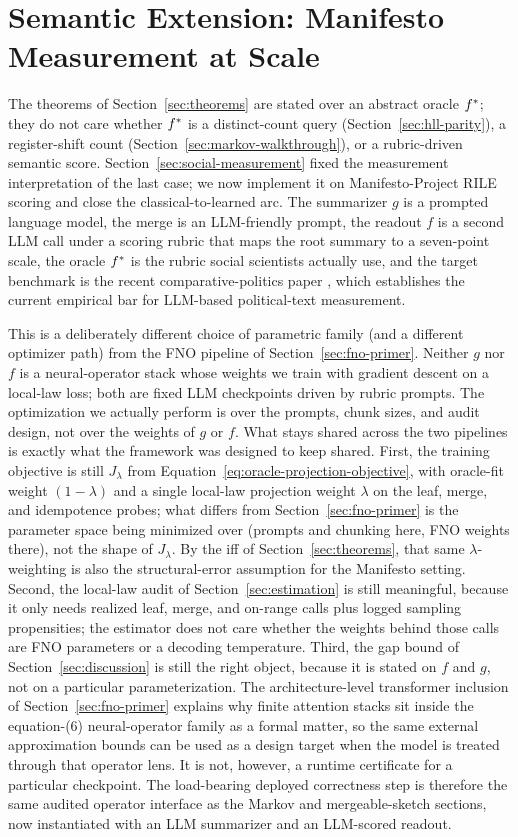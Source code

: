 \section{Semantic Extension: Manifesto Measurement at Scale}\label{sec:manifesto-llm}

The theorems of Section~\ref{sec:theorems} are stated over an abstract oracle $f^\ast$; they do not care whether $f^\ast$ is a distinct-count query (Section~\ref{sec:hll-parity}), a register-shift count (Section~\ref{sec:markov-walkthrough}), or a rubric-driven semantic score. Section~\ref{sec:social-measurement} fixed the measurement interpretation of the last case; we now implement it on Manifesto-Project RILE scoring and close the classical-to-learned arc. The summarizer $g$ is a prompted language model, the merge is an LLM-friendly prompt, the readout $f$ is a second LLM call under a scoring rubric that maps the root summary to a seven-point scale, the oracle $f^\ast$ is the rubric social scientists actually use, and the target benchmark is the recent comparative-politics paper \citet{BenoitEtAl2025}, which establishes the current empirical bar for LLM-based political-text measurement.

This is a deliberately different choice of parametric family (and a
different optimizer path) from the FNO pipeline of
Section~\ref{sec:fno-primer}. Neither $g$ nor $f$ is a neural-operator
stack whose weights we train with gradient descent on a local-law loss;
both are fixed LLM checkpoints driven by rubric prompts. The
optimization we actually perform is over the prompts, chunk sizes, and
audit design, not over the weights of $g$ or $f$. What stays shared
across the two pipelines is exactly what the framework was designed
to keep shared. First, the training objective is still
$J_\lambda$ from Equation~\eqref{eq:oracle-projection-objective}, with
oracle-fit weight $(1-\lambda)$ and a single local-law projection
weight $\lambda$ on the leaf, merge, and idempotence probes; what
differs from Section~\ref{sec:fno-primer} is the parameter space being
minimized over (prompts and chunking here, FNO weights there), not the
shape of $J_\lambda$. By the iff of Section~\ref{sec:theorems}, that
same $\lambda$-weighting is also the structural-error assumption for
the Manifesto setting. Second, the local-law audit of
Section~\ref{sec:estimation} is still meaningful, because it only needs
realized leaf, merge, and on-range calls plus logged sampling
propensities; the estimator does not care whether the weights behind
those calls are FNO parameters or a decoding temperature. Third, the
gap bound of Section~\ref{sec:discussion} is still the right object,
because it is stated on $f$ and $g$, not on a particular
parameterization. The architecture-level transformer inclusion of
Section~\ref{sec:fno-primer} explains why finite attention stacks sit
inside the equation-(6) neural-operator family as a formal matter, so
the same external approximation bounds can be used as a design target
when the model is treated through that operator lens. It is not,
however, a runtime certificate for a particular checkpoint. The
load-bearing deployed correctness step is therefore the same audited
operator interface as the Markov and mergeable-sketch sections, now
instantiated with an LLM summarizer and an LLM-scored readout.

